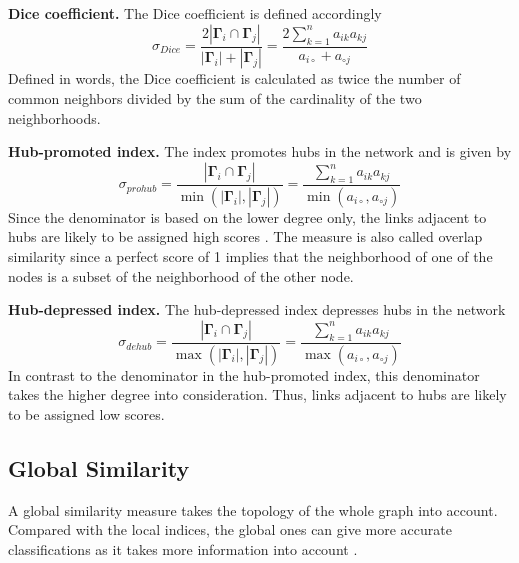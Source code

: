 \textbf{Dice coefficient.} The Dice coefficient is defined accordingly
\begin{equation}
    \label{dice}
    \sigma_{Dice} = \frac{2 |\bm{\Gamma}_i \cap \bm{\Gamma}_j|}{|\bm{\Gamma}_i|+|\bm{\Gamma}_j|}= \frac{2\sum_{k=1}^n a_{ik}a_{kj}}{a_{i \circ }+a_{\circ j}}
\end{equation}
Defined in words, the Dice coefficient is calculated as twice the number of common neighbors divided by the sum of the cardinality of the two neighborhoods. 

\textbf{Hub-promoted index.} The index promotes hubs in the network and is given by
\begin{equation}
    \label{prohub}
    \sigma_{prohub} = \frac{|\bm{\Gamma}_i \cap \bm{\Gamma}_j|}{\min(|\bm{\Gamma}_i|,|\bm{\Gamma}_j|)} = \frac{\sum_{k=1}^n a_{ik}a_{kj}}{\min(a_{i \circ },a_{\circ j})}
\end{equation}
Since the denominator is based on the lower degree only, the links adjacent to hubs are likely to be assigned high scores \citep{lu2011}. The measure is also called overlap similarity \citep{fouss2016algorithms} since a perfect score of 1 implies that the neighborhood of one of the nodes is a subset of the neighborhood of the other node.

\textbf{Hub-depressed index.} The hub-depressed index depresses hubs in the network \citep{fouss2016algorithms}
\begin{equation}
    \label{dehub}
    \sigma_{dehub} = \frac{|\bm{\Gamma}_i \cap \bm{\Gamma}_j|}{\max(|\bm{\Gamma}_i|,|\bm{\Gamma}_j|)} = \frac{\sum_{k=1}^n a_{ik}a_{kj}}{\max(a_{i \circ },a_{\circ j})}
\end{equation}
In contrast to the denominator in the hub-promoted index, this denominator takes the higher degree into consideration. Thus, links adjacent to hubs are likely to be assigned low scores. 

\begin{comment}
\textbf{Adamic index.} 
\begin{equation}
    \label{adamic}
    \sigma_{Adamic} = \frac{|\bm{\Gamma}_i \cap \bm{\Gamma}_j|}{\log(|\bm{\Gamma}_i|,|\bm{\Gamma}_j|)} = \frac{\sum_{k=1}^n a_{ik}a_{kj}}{\max(a_{i \circ },a_{\circ j})}
\end{equation}
\end{comment}

\subsection{Global Similarity}
A global similarity measure takes the topology of the whole graph into account. Compared with the local indices, the global ones can give more accurate classifications as it takes more information into account \citep{lu2011}.

